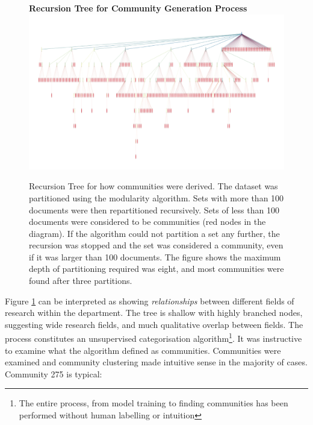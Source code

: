 \begin{center}
\begin{figure}[H]
  \centering
  \textbf{Recursion Tree for Community Generation Process}
    \includegraphics[width=\textwidth]{Analysis/comms.png}
    \caption[Recursion Tree for Document Community Generation]{Recursion Tree for how communities were derived. The dataset was partitioned using the modularity algorithm. Sets with more than 100 documents were then repartitioned recursively. Sets of less than 100 documents were considered to be communities (red nodes in the diagram). If the algorithm could not partition a set any further, the recursion was stopped and the set was considered a community, even if it was larger than 100 documents.  The figure shows the maximum depth of partitioning required was eight, and most communities were found after three partitions.}
    \label{fig:COMMTREE}

\end{figure} 
\end{center}
Figure \ref{fig:COMMTREE} can be interpreted as showing \emph{relationships} between different fields of research within the department. The tree is shallow with highly branched nodes, suggesting wide research fields, and much qualitative overlap between fields.
The process constitutes an unsupervised categorisation algorithm\footnote{The entire process, from model training to finding communities has been performed without human labelling or intuition}. It was instructive to examine what the algorithm defined as communities.
Communities were examined and community clustering made intuitive sense in the majority of cases. Community 275 is typical:
